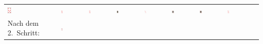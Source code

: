 \begin{tabular}{m{30mm}m{11mm}m{11mm}m{11mm}m{11mm}m{11mm}m{11mm}m{11mm}m{11mm}}
\includegraphics[width=0.08\textwidth]{./inf/SEKII/19_Java_Sortierverfahren/Karo7.png}
&
\includegraphics[width=0.08\textwidth]{./inf/SEKII/19_Java_Sortierverfahren/Karo8.png}
&
\includegraphics[width=0.08\textwidth]{./inf/SEKII/19_Java_Sortierverfahren/Karo10.png}
&
\includegraphics[width=0.08\textwidth]{./inf/SEKII/19_Java_Sortierverfahren/KaroBube.png}
&
\includegraphics[width=0.08\textwidth]{./inf/SEKII/19_Java_Sortierverfahren/KaroAs.png}
&
\includegraphics[width=0.08\textwidth]{./inf/SEKII/19_Java_Sortierverfahren/KaroKoenig.png}
&
\includegraphics[width=0.08\textwidth]{./inf/SEKII/19_Java_Sortierverfahren/KaroDame.png}
&
\includegraphics[width=0.08\textwidth]{./inf/SEKII/19_Java_Sortierverfahren/Karo9.png}
\\
Nach dem 2.\ Schritt: &
\includegraphics[width=0.08\textwidth]{./inf/SEKII/19_Java_Sortierverfahren/Karo7.png}

\end{tabular}
